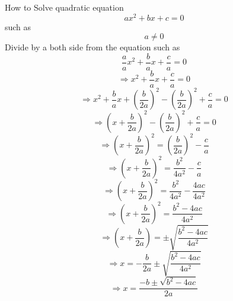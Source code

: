 \documentclass[10pt]{article}
\begin{document}
How to Solve quadratic equation $$ax^{2}+bx+c=0$$ such as $$a \neq 0$$
Divide by a both side from the equation
such as
$$\frac{a}{a}x^2 + \frac{b}{a}x + \frac{c}{a} = 0$$
$$\Rightarrow x^{2}+\frac{b}{a}x + \frac{c}{a} = 0$$
$$\Rightarrow x^{2} + \frac{b}{a}x + (\frac{b}{2a})^2 - (\frac{b}{2a})^2 + \frac{c}{a}=0$$
$$\Rightarrow (x + \frac{b}{2a})^2 - (\frac{b}{2a})^{2} + \frac{c}{a} = 0$$
$$\Rightarrow (x + \frac{b}{2a})^2 = (\frac{b}{2a})^2 - \frac{c}{a}$$
$$\Rightarrow (x + \frac{b}{2a})^2 = \frac{b^2}{4a^{2}} - \frac{c}{a}$$
$$\Rightarrow (x + \frac{b}{2a})^2 = \frac{b^{2}}{4a^{2}} - \frac{4ac}{4a^{2}}$$
$$\Rightarrow (x + \frac{b}{2a})^2 = \frac{b^{2} - 4ac}{4a^{2}}$$
$$\Rightarrow (x + \frac{b}{2a}) =\pm \sqrt{\frac{b^{2} - 4ac}{4a^{2}}}$$
$$\Rightarrow x = -\frac{b}{2a} \pm \sqrt{\frac{b^{2} - 4ac}{4a^{2}}}$$
$$\Rightarrow x = \frac{-b\pm\sqrt{b^{2} - 4ac}}{2a}$$
\end{document}
